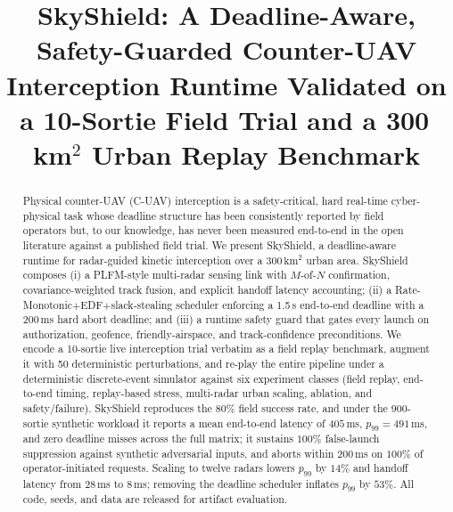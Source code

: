\documentclass[conference]{IEEEtran}
\begin{document}
\title{SkyShield: A Deadline-Aware, Safety-Guarded Counter-UAV Interception Runtime Validated on a 10-Sortie Field Trial and a 300\,km$^2$ Urban Replay Benchmark}

\author{
}

\maketitle

\begin{abstract}
Physical counter-UAV (C-UAV) interception is a safety-critical, hard real-time
cyber-physical task whose deadline structure has been consistently reported by
field operators but, to our knowledge, has never been measured end-to-end in
the open literature against a published field trial.  We present SkyShield,
a deadline-aware runtime for radar-guided kinetic interception over a
$300\,\text{km}^2$ urban area.  SkyShield composes (i) a PLFM-style
multi-radar sensing link with $M$-of-$N$ confirmation, covariance-weighted
track fusion, and explicit handoff latency accounting; (ii) a
Rate-Monotonic$+$EDF$+$slack-stealing scheduler enforcing a 1.5\,s end-to-end
deadline with a 200\,ms hard abort deadline; and (iii) a runtime safety guard
that gates every launch on authorization, geofence, friendly-airspace, and
track-confidence preconditions.  We encode a 10-sortie live interception
trial verbatim as a field replay benchmark, augment it with 50 deterministic
perturbations, and re-play the entire pipeline under a deterministic
discrete-event simulator against six experiment classes (field replay,
end-to-end timing, replay-based stress, multi-radar urban scaling,
ablation, and safety/failure).  SkyShield reproduces the 80\% field success
rate, and under the 900-sortie synthetic workload it reports a mean
end-to-end latency of $405$\,ms, $p_{99}=491$\,ms, and zero deadline misses
across the full matrix; it sustains $100\%$ false-launch suppression against
synthetic adversarial inputs, and aborts within 200\,ms on $100\%$ of
operator-initiated requests.  Scaling to twelve radars lowers $p_{99}$ by
$14\%$ and handoff latency from $28$\,ms to $8$\,ms; removing the
deadline scheduler inflates $p_{99}$ by $53\%$.  All code, seeds, and data
are released for artifact evaluation.
\end{abstract}
\end{document}
